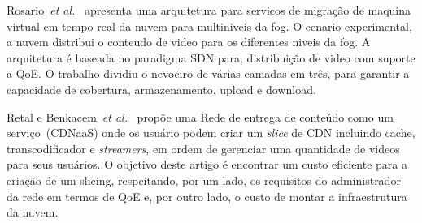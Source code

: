 Rosario~\textit{et al.}~\cite{rosarioSENSORS2018} apresenta uma arquitetura para servicos de migração de maquina virtual em tempo real da nuvem para multiniveis da fog. O cenario experimental, a nuvem distribui o conteudo de video para os diferentes niveis da fog. A arquitetura é baseada no paradigma SDN para, distribuição de video com suporte a QoE. O trabalho dividiu o nevoeiro de várias camadas em três, para garantir a capacidade de cobertura, armazenamento, upload e download.

Retal e Benkacem~\textit{et al.}~\cite{taleb:JSAC18, retalICC2017} propõe uma Rede de entrega de conteúdo como um serviço~(CDNaaS) onde os usuário podem criar um \textit{slice} de CDN incluindo cache, transcodificador e \textit{streamers}, em ordem de gerenciar uma quantidade de videos para seus usuários.%
O objetivo deste artigo é encontrar um custo eficiente para a criação de um slicing, respeitando, por um lado, os requisitos do administrador da rede em termos de QoE e, por outro lado, o custo de montar a infraestrutura da nuvem.%



